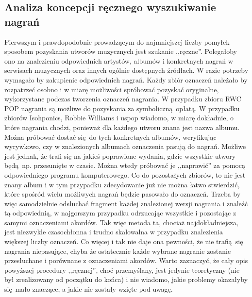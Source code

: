 \subsection{Analiza koncepcji ręcznego wyszukiwanie nagrań} Pierwszym i prawdopodobnie
prowadzącym do najmniejszej liczby pomyłek sposobem pozyskania utworów muzycznych jest szukanie
,,ręczne''. Polegałoby ono na znalezieniu odpowiednich artystów, albumów i konkretnych nagrań w
serwisach muzycznych oraz innych ogólnie dostępnych źródłach. W razie potrzeby wymagało by
zakupienie odpowiednich nagrań. Każdy zbiór oznaczeń należało by rozpatrzeć osobno i w miarę
możliwości spróbować pozyskać oryginalne, wykorzystane podczas tworzenia oznaczeń nagrania. W
przypadku zbioru RWC POP nagrania są możliwe do pozyskania za symboliczną opłatą. W przypadku
zbiorów Isohponics, Robbie Williams i uspop wiadomo, w miarę dokładnie, o które nagrania chodzi,
ponieważ dla każdego utworu znana jest nazwa albumu. Można próbować dostać się do tych konkretnych
albumów, weryfikując wyrywkowo, czy w znalezionych albumach oznaczenia pasują do nagrań. Możliwe
jest jednak, że trafi się na jakieś poprawione wydania, gdzie wszystkie utwory będą np. przesunięte
w czasie. Można wtedy próbować je ,,naprawić'' za pomocą odpowiedniego programu komputerowego. Co do
pozostałych zbiorów, to nie jest znany album i w tym przypadku zdecydowanie już nie można łatwo
stwierdzić, które spośród wielu możliwych nagrań będzie pasowało do oznaczeń. Trzeba by więc
samodzielnie odsłuchać fragment każdej znalezionej wersji nagrania i znaleźć tą odpowiednią, w
najgorszym przypadku odrzucając wszystkie i pozostając z samymi oznaczeniami akordów. Tak więc
metoda ta, chociaż najdokładniejsza, jest niezwykle czasochłonna i trudno skalowalna w przypadku
znalezienia większej liczby oznaczeń.  Co więcej i tak nie daje ona pewności, że nie trafią się
nagrania niepasujące, chyba że ostatecznie każde wybrane nagranie zostanie przesłuchane i porównane
z oznaczeniami akordów. Warto zaznaczyć, że cały opis powyższej procedury ,,ręcznej'', choć
przemyślany, jest jedynie teoretyczny (nie był zrealizowany od początku do końca) i nie wiadomo,
jakie problemy okazałyby się mało znaczące, a jakie nie zostały wzięte pod uwagę. 

